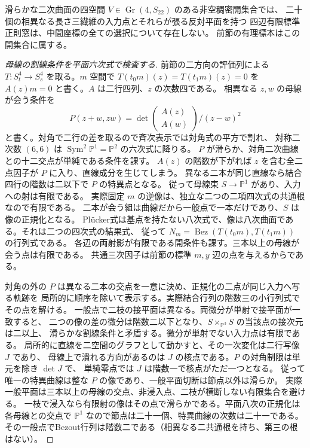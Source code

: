 \begin{theorem}\label{thm:generic-quadric-all-middles-exclusion}
滑らかな二次曲面の四空間 $V\in\operatorname{Gr}(4,S_{22})$ のある非空稠密開集合では、
二十個の相異なる長さ三繊維の入力点とそれらが張る反対平面を持つ
四辺有限標準正則窓は、中間座標の全ての選択について存在しない。
前節の有理標本はこの開集合に属する。
\end{theorem}
\begin{proof}[母線の割線条件を平面六次式で検査する]
前節の二方向の評価列による $T:S_t^4\to S_s^4$ を取る。$m$ 空間で
$T(t_0m)(z)=T(t_1m)(z)=0$ を $A(z)m=0$ と書く。$A$ は二行四列、$z$ の次数四である。
相異なる $z,w$ の母線が会う条件を
\[
 P(z+w,zw)=\det\begin{pmatrix}A(z)\\A(w)\end{pmatrix}/(z-w)^2
\]
と書く。対角で二行の差を取るので斉次表示では対角式の平方で割れ、
対称二次数 $(6,6)$ は $\operatorname{Sym}^2\mathbb P^1=\mathbb P^2$ の六次式に降りる。
$P$ が滑らか、対角二次曲線との十二交点が単純である条件を課す。
$A(z)$ の階数が下がれば $z$ を含む全二点因子が $P$ に入り、直線成分を生じてしまう。
異なる二本が同じ直線なら結合四行の階数は二以下で $P$ の特異点となる。
従って母線束 $S\to\mathbb P^1$ があり、入力への射は有限である。
実際固定 $m$ の逆像は、独立な二つの二項四次式の共通根なので有限である。
二本が会う組は曲線だから一般点で一本だけであり、$S$ は像の正規化となる。
Plücker式は基点を持たない八次式で、像は八次曲面である。それは二つの四次式の結果式、
従って $N_m=\operatorname{Bez}(T(t_0m),T(t_1m))$ の行列式である。
各辺の両射影が有限である開条件も課す。三本以上の母線が会う点は有限である。
共通三次因子は前節の標準 $m,y$ 辺の点を与えるからである。

対角の外の $P$ は異なる二本の交点を一意に決め、正規化の二点が同じ入力へ写る軌跡を
局所的に順序を除いて表示する。実際結合行列の階数三の小行列式でその点を解ける。
一般点で二枝の接平面は異なる。両微分が単射で接平面が一致すると、
二つの像の差の微分は階数二以下となり、$S\times_{\mathbb P^3}S$ の当該点の接次元は二以上、
滑らかな割線条件と矛盾する。微分が単射でない入力点は有限である。
局所的に直線を二空間のグラフとして動かすと、その一次変化は二行写像 $J$ であり、
母線上で潰れる方向があるのは $J$ の核点である。$P$ の対角制限は単元を除き $\det J$ で、
単純零点では $J$ は階数一で核点がただ一つとなる。
従って唯一の特異曲線は整な $P$ の像であり、一般平面切断は節点以外は滑らか。
実際一般平面は三本以上の母線の交点、非浸入点、二枝が横断しない有限集合を避ける。
一枝で浸入なら有限射の像はその点で滑らかである。平面八次の正規化は各母線との交点で
$\mathbb P^1$ なので節点は二十一個、特異曲線の次数は二十一である。
その一般点でBezout行列は階数二である（相異なる二共通根を持ち、第三の根はない）。
\end{proof}

